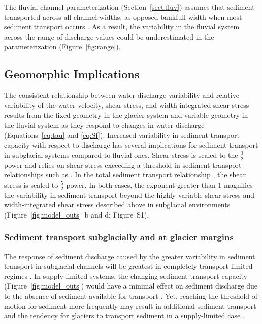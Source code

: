 \documentclass[11pt]{article}
\begin{document}
\begin{spacing}{1}
  The fluvial channel parameterization (Section~\ref{sect:fluv}) assumes that sediment transported across all channel widths, as opposed bankfull width when most sediment transport occurs \citep{wolman1960}.
  As a result, the variability in the fluvial system across the range of discharge values could be underestimated in the parameterization (Figure~\ref{fig:range}).


  
  \subsection{Geomorphic Implications}
  \label{sect:GI}
  The consistent relationship between water discharge variability and relative variability of the water velocity, shear stress, and width-integrated shear stress results from the fixed geometry in the glacier system and variable geometry in the fluvial system as they respond to changes in water discharge (Equations~\ref{eq:tau} and \ref{eq:Sf}).
  Increased variability in sediment transport capacity with respect to discharge has several implications for sediment transport in subglacial systems compared to fluvial ones.
  Shear stress is scaled to the $\frac{3}{2}$ power  and relies on shear stress exceeding a threshold in sediment transport relationships  such as \citet{meyer1948}.
  In the total sediment transport relationship \citet{engelund1967}, the shear stress is scaled to $\frac{5}{2}$ power.
  In both cases, the exponent greater than $1$ magnifies the variability in sediment transport beyond the highly variable shear stress and width-integrated shear stress described above in subglacial environments (Figure~\ref{fig:model_outs}\, b and d; Figure~S1).

  
  \subsubsection{Sediment transport subglacially and at glacier margins}

  The response of sediment discharge caused by the greater variability in sediment transport in subglacial channels will be greatest in completely transport-limited regimes \citep{kasmalkar2019}.
  In supply-limited systems, the changing sediment transport capacity (Figure~\ref{fig:model_outs}) would have a minimal effect on sediment discharge due to the absence of sediment available for transport \citep{delaney2019}.
  Yet, reaching the threshold of motion for sediment more frequently may result in additional sediment transport and the tendency for glaciers to transport sediment in a supply-limited case \citep[e.g.][]{herman2015}.


\end{spacing}
\end{document}
